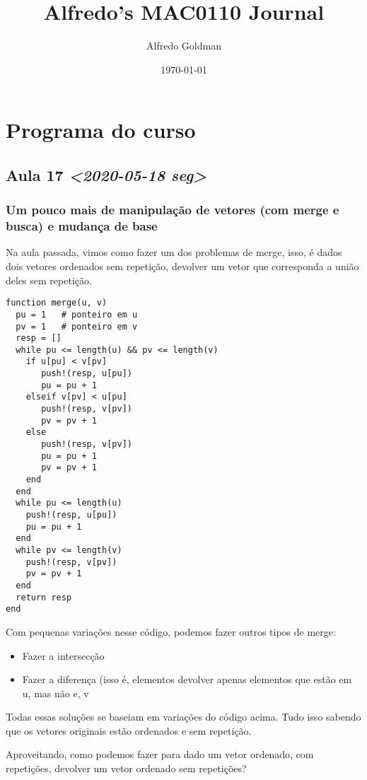 \documentclass[a4paper]{article}
\author{Alfredo Goldman}
\date{\today}
\title{Alfredo's MAC0110 Journal}
\begin{document}
\maketitle

\section{Programa do curso}

\subsection{Aula 17 \textit{<2020-05-18 seg>}}
\label{sec:orgaa1f2bc}
\subsubsection{Um pouco mais de manipulação de vetores (com merge e busca) e mudança de base}
\label{sec:org690870a}
Na aula passada, vimos como fazer um dos problemas de merge, isso, é
dados dois vetores ordenados sem repetição, devolver um vetor que
corresponda a união deles sem repetição.
\lstset{language=ein-julia,label= ,caption= ,captionpos=b,numbers=none}
\begin{lstlisting}
function merge(u, v)
  pu = 1   # ponteiro em u
  pv = 1   # ponteiro em v
  resp = []
  while pu <= length(u) && pv <= length(v)
    if u[pu] < v[pv]
       push!(resp, u[pu])
       pu = pu + 1
    elseif v[pv] < u[pu]
       push!(resp, v[pv])
       pv = pv + 1
    else
       push!(resp, v[pv])
       pu = pu + 1
       pv = pv + 1
    end
  end
  while pu <= length(u)
    push!(resp, u[pu])
    pu = pu + 1
  end
  while pv <= length(v)
    push!(resp, v[pv])
    pv = pv + 1
  end
  return resp
end
\end{lstlisting}

Com pequenas variações nesse código, podemos fazer outros tipos de merge:
\begin{itemize}
\item Fazer a intersecção
\item Fazer a diferença (isso é, elementos devolver apenas elementos que estão
em u, mas não e, v
\end{itemize}


Todas essas soluções se baseiam em variações do código acima. Tudo isso
sabendo que os vetores originais estão ordenados e sem repetição.

Aproveitando, como podemos fazer para dado um vetor ordenado, com repetições,
devolver um vetor ordenado sem repetições?
\end{document}

